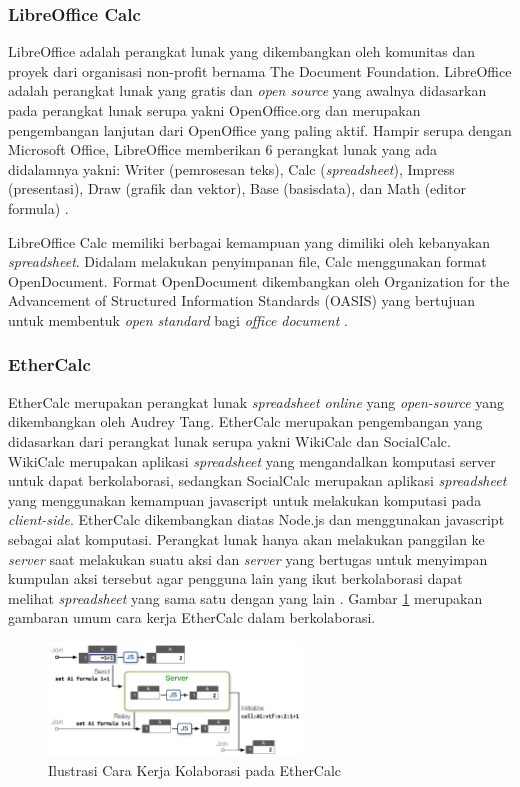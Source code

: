     \subsubsection{LibreOffice Calc}
    LibreOffice adalah perangkat lunak yang dikembangkan oleh komunitas dan proyek dari organisasi non-profit bernama The Document Foundation. LibreOffice adalah perangkat lunak yang gratis dan \textit{open source} yang awalnya didasarkan pada perangkat lunak serupa yakni OpenOffice.org dan merupakan pengembangan lanjutan dari OpenOffice yang paling aktif. Hampir serupa dengan Microsoft Office, LibreOffice memberikan 6 perangkat lunak yang ada didalamnya yakni: Writer (pemrosesan teks), Calc (\textit{spreadsheet}), Impress (presentasi), Draw (grafik dan vektor), Base (basisdata), dan Math (editor formula) \citep{LibreOffice}. 

    LibreOffice Calc memiliki berbagai kemampuan yang dimiliki oleh kebanyakan \textit{spreadsheet}. Didalam melakukan penyimpanan file, Calc menggunakan format OpenDocument. Format OpenDocument dikembangkan oleh Organization for the Advancement of Structured Information Standards (OASIS) yang bertujuan untuk membentuk \textit{open standard} bagi \textit{office document} \citep{OpenDocument}. 

    \subsubsection{EtherCalc}
    EtherCalc merupakan perangkat lunak \textit{spreadsheet online} yang \textit{open-source} yang dikembangkan oleh Audrey Tang. EtherCalc merupakan pengembangan yang didasarkan dari perangkat lunak serupa yakni WikiCalc dan SocialCalc. WikiCalc merupakan aplikasi \textit{spreadsheet} yang mengandalkan komputasi server untuk dapat berkolaborasi, sedangkan SocialCalc merupakan aplikasi \textit{spreadsheet} yang menggunakan kemampuan javascript untuk melakukan komputasi pada \textit{client-side}. EtherCalc dikembangkan diatas Node.js dan menggunakan javascript sebagai alat komputasi. Perangkat lunak hanya akan melakukan panggilan ke \textit{server} saat melakukan suatu aksi dan \textit{server} yang bertugas untuk menyimpan kumpulan aksi tersebut agar pengguna lain yang ikut berkolaborasi dapat melihat \textit{spreadsheet} yang sama satu dengan yang lain \citep{EtherCalc}. Gambar \ref{IlustrasiEtherCalc} merupakan gambaran umum cara kerja EtherCalc dalam berkolaborasi.

    \begin{figure}[htb]
        \centering
        \includegraphics[width=0.6\textwidth]{resources/chapter-2-ethercalc.png}
        \caption{Ilustrasi Cara Kerja Kolaborasi pada EtherCalc}
        \label{IlustrasiEtherCalc}
    \end{figure}

